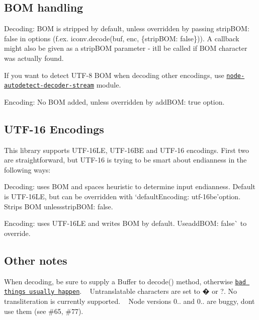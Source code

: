 \subsection*{B\+OM handling}


\begin{DoxyItemize}
\item Decoding\+: B\+OM is stripped by default, unless overridden by passing {\ttfamily strip\+B\+OM\+: false} in options (f.\+ex. {\ttfamily iconv.\+decode(buf, enc, \{strip\+B\+OM\+: false\})}). A callback might also be given as a {\ttfamily strip\+B\+OM} parameter -\/ it\textquotesingle{}ll be called if B\+OM character was actually found.
\item If you want to detect U\+T\+F-\/8 B\+OM when decoding other encodings, use \href{https://github.com/danielgindi/node-autodetect-decoder-stream}{\tt node-\/autodetect-\/decoder-\/stream} module.
\item Encoding\+: No B\+OM added, unless overridden by {\ttfamily add\+B\+OM\+: true} option.
\end{DoxyItemize}

\subsection*{U\+T\+F-\/16 Encodings}

This library supports U\+T\+F-\/16\+LE, U\+T\+F-\/16\+BE and U\+T\+F-\/16 encodings. First two are straightforward, but U\+T\+F-\/16 is trying to be smart about endianness in the following ways\+:
\begin{DoxyItemize}
\item Decoding\+: uses B\+OM and \textquotesingle{}spaces heuristic\textquotesingle{} to determine input endianness. Default is U\+T\+F-\/16\+LE, but can be overridden with `default\+Encoding\+: \textquotesingle{}utf-\/16be'{\ttfamily option. Strips B\+OM unless}strip\+B\+OM\+: false{\ttfamily .}
\item {\ttfamily Encoding\+: uses U\+T\+F-\/16\+LE and writes B\+OM by default. Use}add\+B\+OM\+: false\`{} to override.
\end{DoxyItemize}

\subsection*{Other notes}

When decoding, be sure to supply a Buffer to decode() method, otherwise \href{https://github.com/ashtuchkin/iconv-lite/wiki/Use-Buffers-when-decoding}{\tt bad things usually happen}. ~\newline
Untranslatable characters are set to � or ?. No transliteration is currently supported. ~\newline
Node versions 0.. and 0.. are buggy, don\textquotesingle{}t use them (see \#65, \#77). ~\newline
